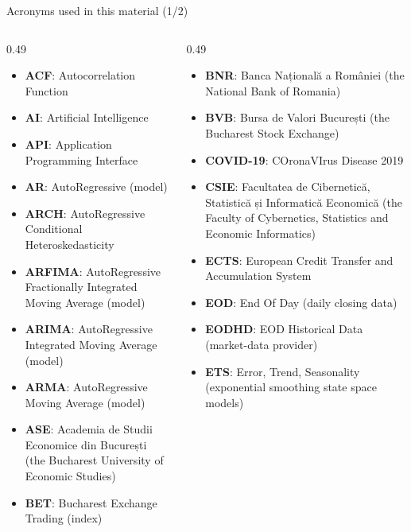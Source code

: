 {
\begin{frame}[noframenumbering]
    \titlepage
\end{frame}
}
\begin{frame}{Acronyms used in this material (1/2)}
\begin{columns}[T]
\begin{column}{0.49\textwidth}
\begin{itemize}\setlength{\itemsep}{0pt}
    \item \textbf{ACF}: Autocorrelation Function
    \item \textbf{AI}: Artificial Intelligence
    \item \textbf{API}: Application Programming Interface
    \item \textbf{AR}: AutoRegressive (model)
    \item \textbf{ARCH}: AutoRegressive Conditional Heteroskedasticity
    \item \textbf{ARFIMA}: AutoRegressive Fractionally Integrated Moving Average (model)
    \item \textbf{ARIMA}: AutoRegressive Integrated Moving Average (model)
    \item \textbf{ARMA}: AutoRegressive Moving Average (model)
    \item \textbf{ASE}: Academia de Studii Economice din București (the Bucharest University of Economic Studies)
    \item \textbf{BET}: Bucharest Exchange Trading (index)
\end{itemize}
\end{column}
\begin{column}{0.49\textwidth}
\begin{itemize}\setlength{\itemsep}{0pt}
    \item \textbf{BNR}: Banca Națională a României (the National Bank of Romania)
    \item \textbf{BVB}: Bursa de Valori București (the Bucharest Stock Exchange)
    \item \textbf{COVID-19}: COronaVIrus Disease 2019
    \item \textbf{CSIE}: Facultatea de Cibernetică, Statistică și Informatică Economică (the Faculty of Cybernetics, Statistics and Economic Informatics)
    \item \textbf{ECTS}: European Credit Transfer and Accumulation System
    \item \textbf{EOD}: End Of Day (daily closing data)
    \item \textbf{EODHD}: EOD Historical Data (market-data provider)
    \item \textbf{ETS}: Error, Trend, Seasonality (exponential smoothing state space models)
\end{itemize}
\end{column}
\end{columns}
\end{frame}
